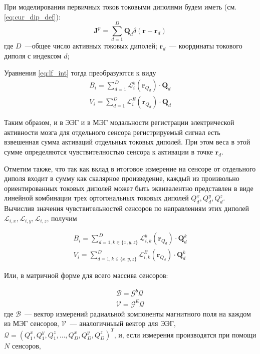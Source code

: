 При моделировании первичных токов токовыми диполями будем иметь (см. \ref{eq:cur_dip_def}):
\begin{equation}
    \mathbf{J}^p = \sum_{d=1}^D \mathbf{Q}_d \delta(\mathbf{r}-\mathbf{r}_d)
\end{equation}
где $D$~---общее число активных токовых диполей; $\mathbf{r}_d$~--- координаты токового
диполя с индексом $d$;

Уравнения \ref{eq:lf_int} тогда преобразуются к виду
\begin{gather}
    B_i = \sum_{d=1}^{D}\mathbf{\mathcal{L}}_i^b(\mathbf{r}_{Q_d})\cdot \mathbf{Q}_d\\
    V_i = \sum_{d=1}^{D}\mathbf{\mathcal{L}}_i^E(\mathbf{r}_{Q_d})\cdot \mathbf{Q}_d
\end{gather}

Таким образом, и в ЭЭГ и в МЭГ модальности регистрации электрической активности мозга
для отдельного сенсора регистрируемый сигнал есть взвешенная сумма активаций отдельных токовых диполей.
При этом веса в этой сумме определяются чувствителностью сенсора к активации в точке $\mathbf{r}_d$.

Отметим также, что так как вклад в итоговое измерение на сенсоре от отдельного диполя входит в сумму
как скалярное произведение, каждый из произвольно ориентированных токовых диполей
может быть эквивалентно представлен в виде линейной комбинации трех ортогональных токовых диполей
$Q_d^x, Q_d^y, Q_d^z$.
Вычислив значения чувствительностей сенсоров по направлениям этих диполей
$\mathcal{L}_{i,x}, \mathcal{L}_{i,y}, \mathcal{L}_{i,z}$, получим


\begin{gather}
    B_i = \sum_{d=1, k \in \{x,y,z\}}^{D}\mathbf{\mathcal{L}}_{i,k}^b(\mathbf{r}_{Q_d})\cdot \mathbf{Q}_d^k\\
    V_i = \sum_{d=1, k \in \{x,y,z\}}^{D}\mathbf{\mathcal{L}}_{i,k}^E(\mathbf{r}_{Q_d})\cdot \mathbf{Q}_d^k
\end{gather}

Или, в матричной форме для всего массива сенсоров:

\begin{gather}
    \mathcal{B} = \mathcal{G}^b \mathcal{Q} \\
    \mathcal{V} = \mathcal{G}^E \mathcal{Q}
\end{gather}
где $\mathcal{B}$~--- вектор измерений радиальной компоненты магнитного поля на каждом из МЭГ сенсоров,
$\mathcal{V}$~--- аналогичныый вектор для ЭЭГ,
$\mathcal{Q} = (Q_1^x, Q_1^y, Q_1^z, \ldots, Q_D^x, Q_D^y, Q_D^z)^T$, и, если измерения производятся при помощи
$N$ сенсоров,

